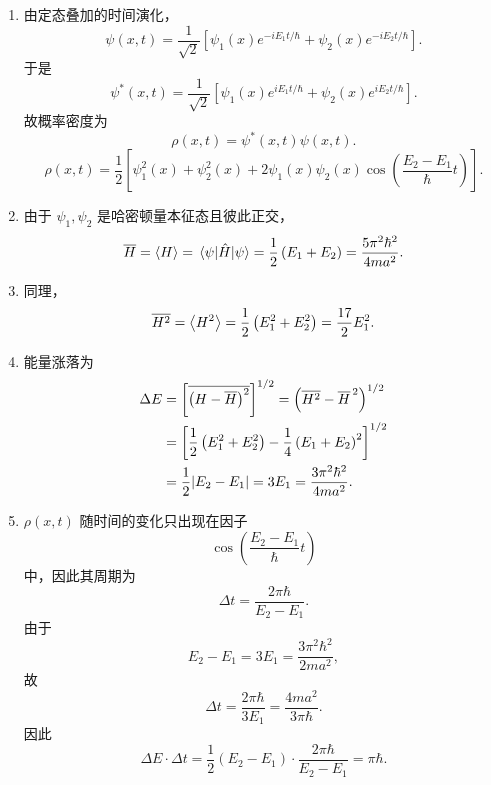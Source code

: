\documentclass[12pt,a4paper]{article}
\begin{document}
\begin{enumerate}[label=(\alph*)]
  \item 由定态叠加的时间演化，
\[
\psi(x,t)=\frac{1}{\sqrt{2}}\left[\psi_1(x)e^{-iE_1t/\hbar}+\psi_2(x)e^{-iE_2t/\hbar}\right].
\]
于是
\[
\psi^*(x,t)=\frac{1}{\sqrt{2}}\left[\psi_1(x)e^{iE_1t/\hbar}+\psi_2(x)e^{iE_2t/\hbar}\right].
\]
故概率密度为
\[
\rho(x,t)=\psi^*(x,t)\psi(x,t).
\]
\[
\rho(x,t)=\frac{1}{2}\left[\psi_1^2(x)+\psi_2^2(x)+2\psi_1(x)\psi_2(x)\cos\left(\frac{E_2-E_1}{\hbar}t\right)\right].
\]

  \item 由于 \(\psi_1,\psi_2\) 是哈密顿量本征态且彼此正交，
\[
\overline{H}=\ev{H}
=\matrixel{\psi}{\hat{H}}{\psi}
=\frac{1}{2}\left(E_1+E_2\right)
=\frac{5\pi^2\hbar^2}{4ma^2}.
\]

  \item 同理，
\[
\overline{H^2}=\ev{H^2}
=\frac{1}{2}\left(E_1^2+E_2^2\right)
=\frac{17}{2}E_1^2.
\]

  \item 能量涨落为
\begin{align*}
  \Delta E&=\left[\overline{\left(H-\overline{H}\right)^2}\right]^{1/2}
  =\left(\overline{H^2}-\overline{H}^{\,2}\right)^{1/2}\\
  &=\left[
  \frac{1}{2}\left(E_1^2+E_2^2\right)
  -\frac{1}{4}\left(E_1+E_2\right)^2
  \right]^{1/2}\\
  &=\frac{1}{2}\abs{E_2-E_1}=3E_1=\frac{3\pi^2\hbar^2}{4ma^2}.
\end{align*}

  \item \(\rho(x,t)\) 随时间的变化只出现在因子
\[
\cos\left(\frac{E_2-E_1}{\hbar}t\right)
\]
中，因此其周期为
\[
\Delta t=\frac{2\pi\hbar}{E_2-E_1}.
\]
由于
\[
E_2-E_1=3E_1=\frac{3\pi^2\hbar^2}{2ma^2},
\]
故
\[
\Delta t=\frac{2\pi\hbar}{3E_1}
=\frac{4ma^2}{3\pi\hbar}.
\]
因此
\[
\Delta E\cdot \Delta t
=
\frac{1}{2}\left(E_2-E_1\right)\cdot \frac{2\pi\hbar}{E_2-E_1}
=
\pi\hbar.
\]
\end{enumerate}

\end{document}
